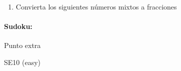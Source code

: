 \documentclass[fleqn]{article}
\begin{document}
\begin{enumerate}
\begin{enumerate}
\noanswer[.25in]
\end{enumerate}
\item Convierta los siguientes números mixtos a fracciones
\begin{enumerate}
\end{enumerate}
\noanswer[.25in]
 \end{enumerate}
\paragraph*{Sudoku:} Punto extra
\cluefont{\Large}
\begin{minipage}{0.45\linewidth}\begin{center}
SE10 (easy) \\
\end{center}\end{minipage}
\end{document}
